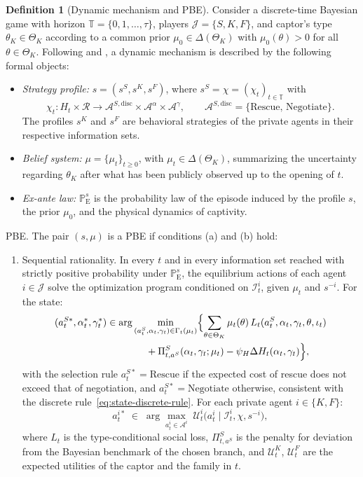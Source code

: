 \documentclass[review,authoryear,12pt]{elsarticle}
\providecommand{\textcite}{\citet}
\theoremstyle{plain}
\theoremstyle{definition}
\newtheorem{definition}[theorem]{Definition}
\newcommand{\ProbE}{\mathbb{P}_{\mathrm{E}}}
\newcommand{\ThetaK}{\Theta_K}
\newcommand{\1}{\mathbf{1}}
\begin{document}
\begin{definition}[Dynamic mechanism and PBE]
\label{def:pbe-mechanism}
Consider a discrete-time Bayesian game with horizon $\mathbb{T}=\{0,1,\ldots,\tau\}$, players $\mathcal{J}=\{S,K,F\}$, and captor's type $\theta_K\in\ThetaK$ according to a common prior $\mu_0\in\Delta(\ThetaK)$ with $\mu_0(\theta)>0$ for all $\theta\in\ThetaK$. Following \textcite{FudenbergTirole1991} and \textcite{KrepsWilson1982}, a dynamic mechanism is described by the following formal objects:

\begin{itemize}
  \item \emph{Strategy profile:} $s=(s^S,s^K,s^F)$, where $s^S=\chi=(\chi_t)_{t\in\mathbb{T}}$ with
  \[
    \chi_t \colon H_t\times\mathcal{R}
    \longrightarrow \mathcal{A}^{S,\mathrm{disc}}\times\mathcal{A}^{\alpha}\times\mathcal{A}^{\gamma},
    \qquad
    \mathcal{A}^{S,\mathrm{disc}}=\{\text{Rescue},\,\text{Negotiate}\}.
  \]
  The profiles $s^K$ and $s^F$ are behavioral strategies of the private agents in their respective information sets.
  \item \emph{Belief system:} $\mu=\{\mu_t\}_{t\ge 0}$, with $\mu_t\in\Delta(\ThetaK)$, summarizing the uncertainty regarding $\theta_K$ after what has been publicly observed up to the opening of $t$.
  \item \emph{Ex-ante law:} $\ProbE^s$ is the probability law of the episode induced by the profile $s$, the prior $\mu_0$, and the physical dynamics of captivity.
\end{itemize}

\smallskip
\noindent PBE. The pair $(s,\mu)$ is a PBE if conditions \textup{(a)} and \textup{(b)} hold:
\begin{enumerate}
  \item[\textup{(a)}] Sequential rationality. In every $t$ and in every information set reached with strictly positive probability under $\ProbE^s$, the equilibrium actions of each agent $i\in\mathcal{J}$ solve the optimization program conditioned on $\mathcal{I}_t^i$, given $\mu_t$ and $s^{-i}$. For the state:
  \[
  \begin{aligned}
  (a_t^{S\ast},\alpha_t^\ast,\gamma_t^\ast)
  &\in
  \arg\min_{(a_t^S,\alpha_t,\gamma_t)\in\Gamma_t(\mu_t)}
  \Bigl\{
  \sum_{\theta\in\ThetaK}\mu_t(\theta)\,L_t(a_t^S,\alpha_t,\gamma_t,\theta,\iota_t)\\
  &\qquad\qquad
  +\Pi_{t,a^S}^S(\alpha_t,\gamma_t;\mu_t)-\psi_H\Delta H_t(\alpha_t,\gamma_t)
  \Bigr\},
  \end{aligned}
  \]
  with the selection rule $a_t^{S\ast}=\text{Rescue}$ if the expected cost of rescue does not exceed that of negotiation, and $a_t^{S\ast}=\text{Negotiate}$ otherwise, consistent with the discrete rule~\eqref{eq:state-discrete-rule}. For each private agent $i\in\{K,F\}$:
  \[
  a_t^{i\ast}\;\in\;
  \arg\max_{a_t^i\in\mathcal{A}^i}
  \;\mathcal{U}^i_t\!\bigl(a_t^i\mid \mathcal{I}_t^i,\chi,s^{-i}\bigr),
  \]
  where $L_t$ is the type-conditional social loss, $\Pi_{t,a^S}^S$ is the penalty for deviation from the Bayesian benchmark of the chosen branch, and $\mathcal{U}^K_t$, $\mathcal{U}^F_t$ are the expected utilities of the captor and the family in $t$.


\end{enumerate}
\end{definition}
\end{document}

